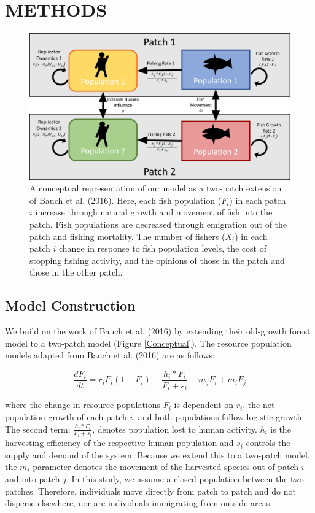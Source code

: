 \documentclass[
  12pt,
]{article}
\begin{document}
\hypertarget{methods}{%
\section{METHODS}\label{methods}}

\begin{figure}
\includegraphics[width=1\linewidth]{CoupledModelConceptual} \caption{A conceptual representation of our model as a two-patch extension of Bauch et al. (2016). Here, each fish population (\(F_i\)) in each patch \(i\) increase through natural growth and movement of fish into the patch. Fish populations are decreased through emigration out of the patch and fishing mortality. The number of fishers (\(X_i\)) in each patch \(i\) change in response to fish population levels, the cost of stopping fishing activity, and the opinions of those in the patch and those in the other patch. \label{Conceptual}}\label{fig:Conceptual}
\end{figure}



\hypertarget{model-construction}{%
\subsection{Model Construction}\label{model-construction}}

We build on the work of Bauch et al. (2016) by extending their old-growth forest model to a two-patch model (Figure \ref{Conceptual}). The resource population models adapted from Bauch et al. (2016) are as follows:

\begin{equation} 
  \frac{dF_i}{dt} = r_iF_i(1-F_i)-\frac{h_i*F_i}{F_i + s_i} - m_jF_i + m_iF_j
  \label{eq:fish1}
\end{equation}

where the change in resource populations \(F_i\) is dependent on \(r_i\), the net population growth of each patch \(i\), and both populations follow logistic growth. The second term: \(\frac{h_i*F_i}{F_i + s_i}\), denotes population lost to human activity. \(h_i\) is the harvesting efficiency of the respective human population and \(s_i\) controls the supply and demand of the system. Because we extend this to a two-patch model, the \(m_i\) parameter denotes the movement of the harvested species out of patch \(i\) and into patch \(j\). In this study, we assume a closed population between the two patches. Therefore, individuals move directly from patch to patch and do not disperse elsewhere, nor are individuals immigrating from outside areas.
\end{document}
